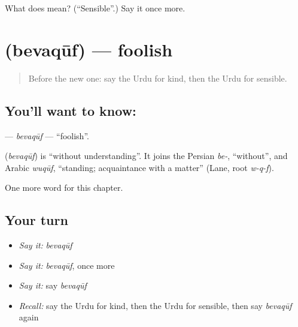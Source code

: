 \begin{tcolorbox}[breakable,colback=teal!4,colframe=teal!35!black,title={Before you move on}]
What does  mean? (\textquotedblleft{}Sensible\textquotedblright{}.) Say it once more.
\end{tcolorbox}
\section[\texorpdfstring{\ur{بیوقوف} (bevaqūf)}{بیوقوف (bevaqūf)}]{ (bevaqūf) — foolish}

\label{lesson:UR-C160-bevaquf}



\begin{quote}
Before the new one: say the Urdu for kind, then the Urdu for sensible.
\end{quote}

\subsection*{You'll want to know: }
\textbf{} — \emph{bevaqūf} — \textquotedblleft{}foolish\textquotedblright{}.

\begin{cousinweb}
\textbf{} (\emph{bevaqūf}) is \textquotedblleft{}without understanding\textquotedblright{}. It joins the Persian \emph{be-}, \textquotedblleft{}without\textquotedblright{}, and Arabic \emph{wuqūf}, \textquotedblleft{}standing; acquaintance with a matter\textquotedblright{} (Lane, root \emph{w-q-f}).
\end{cousinweb}

\begin{grammarlens}[title={What you've built}]
One more word for this chapter.
\end{grammarlens}

\subsection*{Your turn}
\begin{itemize}
\raggedright
  \item \emph{Say it:} \emph{bevaqūf}
  \item \emph{Say it:} \emph{bevaqūf}, once more
  \item \emph{Say it:} say \emph{bevaqūf}
  \item \emph{Recall:} say the Urdu for kind, then the Urdu for sensible, then say \emph{bevaqūf} again
\end{itemize}

